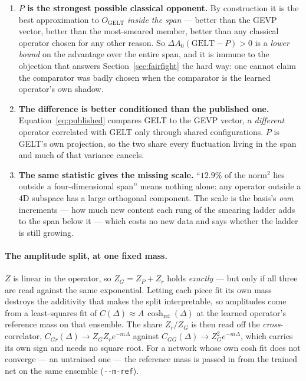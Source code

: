 \documentclass[11pt,a4paper]{article}
\newcommand{\dAzero}{\Delta A_0}
\newcommand{\OG}{O_{\mathrm{GELT}}}
\begin{document}
\begin{enumerate}
  \item \textbf{$P$ is the strongest possible classical opponent.} By
        construction it is the best approximation to $\OG$ \emph{inside the
        span} --- better than the GEVP vector, better than the most-smeared
        member, better than any classical operator chosen for any other reason.
        So $\dAzero(\text{GELT} - P) > 0$ is a \emph{lower bound} on the
        advantage over the entire span, and it is immune to the objection that
        answers Section~\ref{sec:fairfight} the hard way: one cannot claim the
        comparator was badly chosen when the comparator is the learned
        operator's own shadow.
  \item \textbf{The difference is better conditioned than the published one.}
        Equation~\eqref{eq:published} compares GELT to the GEVP vector, a
        \emph{different} operator correlated with GELT only through shared
        configurations. $P$ is GELT's own projection, so the two share every
        fluctuation living in the span and much of that variance cancels.
  \item \textbf{The same statistic gives the missing scale.} ``$12.9\%$ of the
        norm${}^2$ lies outside a four-dimensional span'' means nothing alone:
        any operator outside a $4$D subspace has a large orthogonal component.
        The scale is the basis's \emph{own} increments --- how much new content
        each rung of the smearing ladder adds to the span below it --- which
        costs no new data and says whether the ladder is still growing.
\end{enumerate}

\paragraph{The amplitude split, at one fixed mass.} $Z$ is linear in the
operator, so $Z_G = Z_P + Z_r$ holds \emph{exactly} --- but only if all three
are read against the same exponential. Letting each piece fit its own mass
destroys the additivity that makes the split interpretable, so amplitudes come
from a least-squares fit of $C(\Delta) \approx A\,\cosh_{\text{ref}}(\Delta)$ at
the learned operator's reference mass on that ensemble. The share $Z_r/Z_G$ is
then read off the \emph{cross}-correlator, $C_{Gr}(\Delta) \to Z_G Z_r
e^{-m\Delta}$ against $C_{GG}(\Delta) \to Z_G^2 e^{-m\Delta}$, which carries its
own sign and needs no square root. For a network whose own cosh fit does not
converge --- an untrained one --- the reference mass is passed in from the
trained net on the same ensemble (\texttt{-{}-m-ref}).
\end{document}
